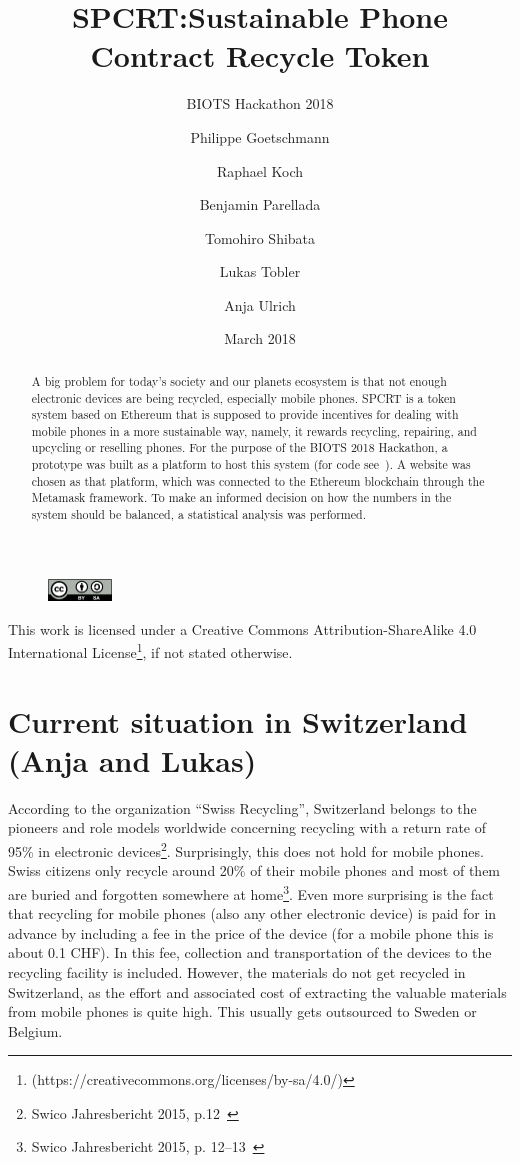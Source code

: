 \documentclass[11pt]{scrartcl}
\title{SPCRT:\@ Sustainable Phone Contract Recycle Token}
\subtitle{BIOTS Hackathon 2018}
\author{%
    Philippe Goetschmann
    \and
    Raphael Koch
    \and
    Benjamin Parellada
    \and
    Tomohiro Shibata
    \and
    Lukas Tobler
    \and
    Anja Ulrich
}
\date{March 2018}
\begin{document}
%
\maketitle
%
\begin{center}
    \begin{figure}[h]
        \centering
        \includegraphics[width=0.15\textwidth]{img/cc_license.png}
        \vspace{-0.3cm}
    \end{figure}
    This work is licensed under a Creative Commons Attribution-ShareAlike 4.0
    International License\footnote{(https://creativecommons.org/licenses/by-sa/4.0/)},
    if not stated otherwise.
\end{center}

\begin{abstract}
    A big problem for today's society and our planets ecosystem is that not
    enough electronic devices are being recycled, especially mobile phones.
    SPCRT is a token system based on Ethereum that is supposed to provide
    incentives for dealing with mobile phones in a more sustainable way, namely,
    it rewards recycling, repairing, and upcycling or reselling phones.  For
    the purpose of the BIOTS 2018 Hackathon, a prototype was built as a platform
    to host this system (for code see~\cite{spcgit}).  A website was chosen as that
    platform, which was connected to the Ethereum blockchain through the
    Metamask framework. To make an informed decision on how the numbers in the
    system should be balanced, a statistical analysis was performed.
\end{abstract}

\section{Current situation in Switzerland (Anja and Lukas)}

According to the organization ``Swiss Recycling'', Switzerland belongs to the pioneers and role models worldwide concerning recycling with a return rate of 95\% in electronic devices\footnote{Swico Jahresbericht 2015, p.12~\cite{swico}}. Surprisingly, this does not hold for mobile phones. Swiss citizens only recycle around 20\% of their mobile phones and most of them are buried and forgotten somewhere at home\footnote{Swico Jahresbericht 2015, p. 12--13~\cite{swico}}. Even more surprising is the fact that recycling for mobile phones (also any other electronic device) is paid for in advance by including a fee in the price of the device (for a mobile phone this is about 0.1 CHF). In this fee, collection and transportation of the devices to the recycling facility is included. However, the materials do not get recycled in Switzerland, as the effort and associated cost of extracting the valuable materials from mobile phones is quite high. This usually gets outsourced to Sweden or Belgium.
\end{document}

